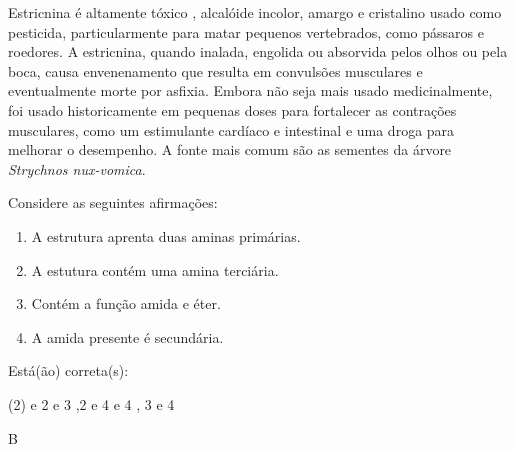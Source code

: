 \documentclass[11pt]{scrartcl}
\begin{document}
\begin{exercise}[points=1]
Estricnina é altamente tóxico , alcalóide incolor, amargo e cristalino usado como pesticida, particularmente para matar pequenos vertebrados, como pássaros e roedores. A estricnina, quando inalada, engolida ou absorvida pelos olhos ou pela boca, causa envenenamento que resulta em convulsões musculares e eventualmente morte por asfixia.  Embora não seja mais usado medicinalmente, foi usado historicamente em pequenas doses para fortalecer as contrações musculares, como um estimulante cardíaco e intestinal  e uma droga para melhorar o desempenho. A fonte mais comum são as sementes da árvore \emph{Strychnos nux-vomica}.


\begin{center}
\end{center}

Considere as seguintes afirmações:

\begin{enumerate}
\item A estrutura aprenta duas aminas primárias.
\item A estutura contém uma amina terciária.
\item Contém a função amida e éter.
\item A amida presente é secundária.
\end{enumerate}


Está(ão) correta(s):

\begin{choice}(2)
 e 2
 e 3
,2 e 4
 e 4
, 3 e 4 
\end{choice}
\end{exercise}
\begin{solution}
B
\end{solution}
\end{document}
